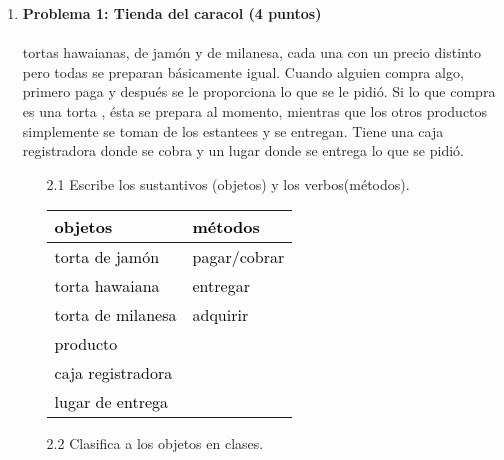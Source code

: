 \documentclass[a4paper,10pt]{article}
\begin{document}
\begin{enumerate}
    \item \textbf{Problema 1: Tienda del caracol (4 puntos)}\\\\
    \hspace*{.5cm}{La tienda del caracol vende productos que tienen un precio fijo por unidad y además preparan} tortas hawaianas, de jamón y de milanesa, cada una con un precio distinto pero todas se preparan básicamente igual. Cuando
   alguien compra algo, primero paga y después se le proporciona lo que se le pidió. Si lo que compra es una torta ,
    ésta se prepara al momento, mientras que los otros productos simplemente se toman de los estantees y se entregan.
    Tiene una caja registradora donde se cobra y un lugar donde se entrega lo que se pidió.
    \begin{enumerate}
        \item [2.1] Escribe los sustantivos (objetos) y los verbos(métodos).
        
        \begin{tabular}{|l|l|}
            \hline
            \rowcolor[rgb]{0.31, 0.78, 0.47}\textcolor{black}{objetos} & \textcolor{black}{métodos}\\
            \hline
            \rowcolor[rgb]{1.0, 0.75, 0.0}\textcolor{black}{torta de jamón} & \textcolor{black}{pagar/cobrar}\\
            \hline
            \rowcolor[rgb]{1.0, 0.75, 0.0}\textcolor{black}{torta hawaiana} & \textcolor{black}{entregar}\\
            \hline
            \rowcolor[rgb]{1.0, 0.75, 0.0}\textcolor{black}{torta de milanesa} & \textcolor{black}{adquirir}\\
            \hline
            \rowcolor[rgb]{1.0, 0.75, 0.0}\textcolor{black}{producto} & \\
            \hline
            \rowcolor[rgb]{1.0, 0.75, 0.0}\textcolor{black}{caja registradora} & \\
            \hline
            \rowcolor[rgb]{1.0, 0.75, 0.0}\textcolor{black}{lugar de entrega} & \\
            \hline
            \end{tabular}
                   
        \item [2.2] Clasifica a los objetos en clases.
        
           \hspace*{2.6cm} {}\\


\end{enumerate}
\end{enumerate}
\end{document}

